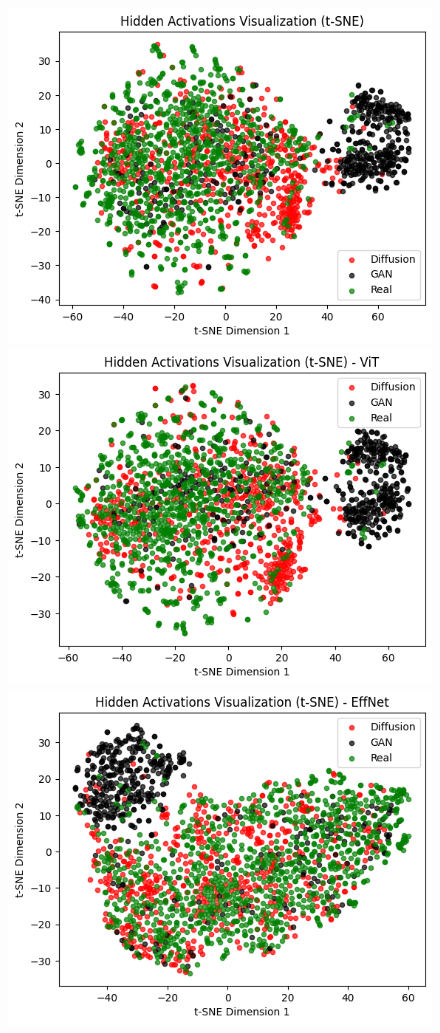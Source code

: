 \documentclass{article} %
\begin{document}
\begin{figure}[h]
    \begin{center}
        \includegraphics[scale=0.34]{figs/tsne.png}
        \includegraphics[scale=0.34]{figs/tsne-vit.png}
        \includegraphics[scale=0.34]{figs/tsne-effnet.png}

\end{center}
\end{figure}
\end{document}
